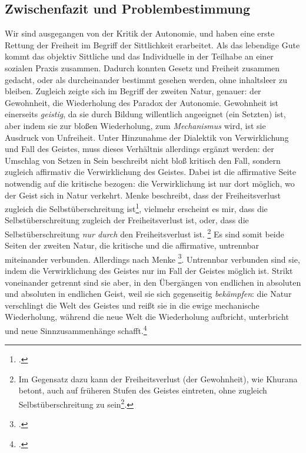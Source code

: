 \documentclass[12pt, a4paper, openany]{report}
\begin{document}
\subsection{Zwischenfazit und Problembestimmung}\label{zwisschenfazit}
Wir sind ausgegangen von der Kritik der Autonomie, und haben eine erste Rettung der Freiheit im Begriff der Sittlichkeit erarbeitet. 
Als das lebendige Gute kommt das objektiv Sittliche und das Individuelle in der Teilhabe an einer sozialen Praxis zusammen. 
Dadurch konnten Gesetz und Freiheit zusammen gedacht, oder als durcheinander bestimmt gesehen werden, ohne inhaltsleer zu bleiben.
Zugleich zeigte sich im Begriff der zweiten Natur, genauer: der Gewohnheit, die Wiederholung des Paradox der Autonomie.
Gewohnheit ist einerseits \emph{geistig}, da sie durch Bildung willentlich angeeignet (ein Setzten) ist, aber indem sie zur bloßen Wiederholung, zum \emph{Mechanismus} wird, ist sie  Ausdruck von Unfreiheit.
Unter Hinzunahme der Dialektik von Verwirklichung und Fall des Geistes, muss dieses Verhältnis allerdings ergänzt werden:
der Umschlag von Setzen in Sein beschreibt nicht bloß kritisch den Fall, sondern zugleich affirmativ die Verwirklichung des Geistes.
Dabei ist die affirmative Seite notwendig auf die kritische bezogen: 
die Verwirklichung ist nur dort möglich, wo der Geist sich in Natur verkehrt.
Menke beschreibt, dass der Freiheitsverlust zugleich die Selbstüberschreitung ist\footcite[Vgl.][145]{menke_autonomie_2018}, vielmehr erscheint es mir, dass die Selbstüberschreitung zugleich der Freiheitsverlust ist, oder, dass die Selbstüberschreitung \emph{nur durch} den Freiheitsverlust ist.%
\footnote{
    Im Gegensatz dazu kann der Freiheitsverlust (der Gewohnheit), wie Khurana betont, auch auf früheren Stufen des Geistes eintreten, ohne zugleich Selbstüberschreitung zu sein\footcite[vgl. z.B.][§88, S. 433. Khurana spricht hier von der Gewohnheit auf den vor-sittlichen Stufen des Geistes]{khurana_freiheit_2017}.
}
Es sind somit beide Seiten der zweiten Natur, die kritische und die affirmative, untrennbar miteinander verbunden.
Allerdings nach Menke \footcite[][147]{menke_autonomie_2018}.
Untrennbar verbunden sind sie, indem die Verwirklichung des Geistes nur im Fall der Geistes möglich ist.
Strikt voneinander getrennt sind sie aber, in den Übergängen von endlichen in absoluten und absoluten in endlichen Geist, weil sie sich gegenseitig \emph{bekämpfen}:
die Natur verschlingt die Welt des Geistes und reißt sie in die ewige mechanische Wiederholung, während die neue Welt die Wiederholung aufbricht, unterbricht und neue Sinnzusammenhänge schafft.\footcite[Vgl.][147]{menke_autonomie_2018}
\end{document}
